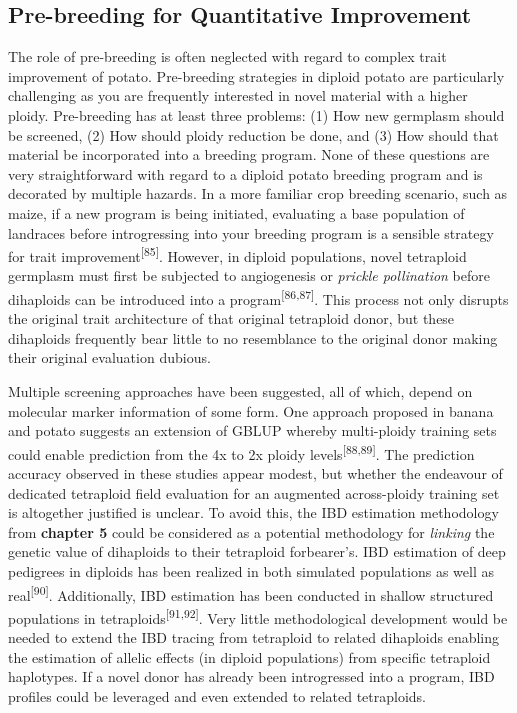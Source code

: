 \subsection{Pre-breeding for Quantitative
Improvement}\label{pre-breeding-for-quantitative-improvement}

The role of pre-breeding is often neglected with regard to complex trait
improvement of potato. Pre-breeding strategies in diploid potato are
particularly challenging as you are frequently interested in novel
material with a higher ploidy. Pre-breeding has at least three problems:
(1) How new germplasm should be screened, (2) How should ploidy
reduction be done, and (3) How should that material be incorporated into
a breeding program. None of these questions are very straightforward
with regard to a diploid potato breeding program and is decorated by
multiple hazards. In a more familiar crop breeding scenario, such as
maize, if a new program is being initiated, evaluating a base population
of landraces before introgressing into your breeding program is a
sensible strategy for trait improvement\textsuperscript{{[}85{]}}.
However, in diploid populations, novel tetraploid germplasm must first
be subjected to angiogenesis or \emph{prickle pollination} before
dihaploids can be introduced into a
program\textsuperscript{{[}86,87{]}}. This process not only disrupts the
original trait architecture of that original tetraploid donor, but these
dihaploids frequently bear little to no resemblance to the original
donor making their original evaluation dubious.

Multiple screening approaches have been suggested, all of which, depend
on molecular marker information of some form. One approach proposed in
banana and potato suggests an extension of GBLUP whereby multi-ploidy
training sets could enable prediction from the 4x to 2x ploidy
levels\textsuperscript{{[}88,89{]}}. The prediction accuracy observed in
these studies appear modest, but whether the endeavour of dedicated
tetraploid field evaluation for an augmented across-ploidy training set
is altogether justified is unclear. To avoid this, the IBD estimation
methodology from \textbf{chapter 5} could be considered as a potential
methodology for \emph{linking} the genetic value of dihaploids to their
tetraploid forbearer's. IBD estimation of deep pedigrees in diploids has
been realized in both simulated populations as well as
real\textsuperscript{{[}90{]}}. Additionally, IBD estimation has been
conducted in shallow structured populations in
tetraploids\textsuperscript{{[}91,92{]}}. Very little methodological
development would be needed to extend the IBD tracing from tetraploid to
related dihaploids enabling the estimation of allelic effects (in
diploid populations) from specific tetraploid haplotypes. If a novel
donor has already been introgressed into a program, IBD profiles could be
leveraged and even extended to related tetraploids.

